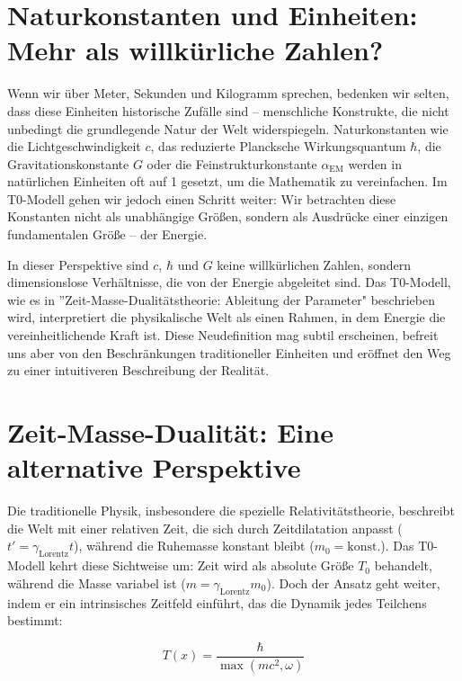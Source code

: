 \documentclass[a4paper,12pt]{article}
\newcommand{\Tfield}{T(x)}
\newcommand{\alphaEM}{\alpha_{\text{EM}}}
\newcommand{\gammaf}{\gamma_{\text{Lorentz}}}
\begin{document}
	\section{Naturkonstanten und Einheiten: Mehr als willkürliche Zahlen?}
	
	Wenn wir über Meter, Sekunden und Kilogramm sprechen, bedenken wir selten, dass diese Einheiten historische Zufälle sind – menschliche Konstrukte, die nicht unbedingt die grundlegende Natur der Welt widerspiegeln. Naturkonstanten wie die Lichtgeschwindigkeit \(c\), das reduzierte Plancksche Wirkungsquantum \(\hbar\), die Gravitationskonstante \(G\) oder die Feinstrukturkonstante \(\alphaEM\) werden in natürlichen Einheiten oft auf 1 gesetzt, um die Mathematik zu vereinfachen. Im T0-Modell gehen wir jedoch einen Schritt weiter: Wir betrachten diese Konstanten nicht als unabhängige Größen, sondern als Ausdrücke einer einzigen fundamentalen Größe – der Energie.
	
	In dieser Perspektive sind \(c\), \(\hbar\) und \(G\) keine willkürlichen Zahlen, sondern dimensionslose Verhältnisse, die von der Energie abgeleitet sind. Das T0-Modell, wie es in ''Zeit-Masse-Dualitätstheorie: Ableitung der Parameter" \cite{pascher_params_2025} beschrieben wird, interpretiert die physikalische Welt als einen Rahmen, in dem Energie die vereinheitlichende Kraft ist. Diese Neudefinition mag subtil erscheinen, befreit uns aber von den Beschränkungen traditioneller Einheiten und eröffnet den Weg zu einer intuitiveren Beschreibung der Realität.
	
	\section{Zeit-Masse-Dualität: Eine alternative Perspektive}
	
	Die traditionelle Physik, insbesondere die spezielle Relativitätstheorie, beschreibt die Welt mit einer relativen Zeit, die sich durch Zeitdilatation anpasst (\(t' = \gammaf t\)), während die Ruhemasse konstant bleibt (\(m_0 = \text{konst.}\)). Das T0-Modell kehrt diese Sichtweise um: Zeit wird als absolute Größe \(T_0\) behandelt, während die Masse variabel ist (\(m = \gammaf m_0\)). Doch der Ansatz geht weiter, indem er ein intrinsisches Zeitfeld einführt, das die Dynamik jedes Teilchens bestimmt:
	
	\begin{equation}
		\Tfield = \frac{\hbar}{\max(m c^2, \omega)}
	\end{equation}
	
\end{document}
